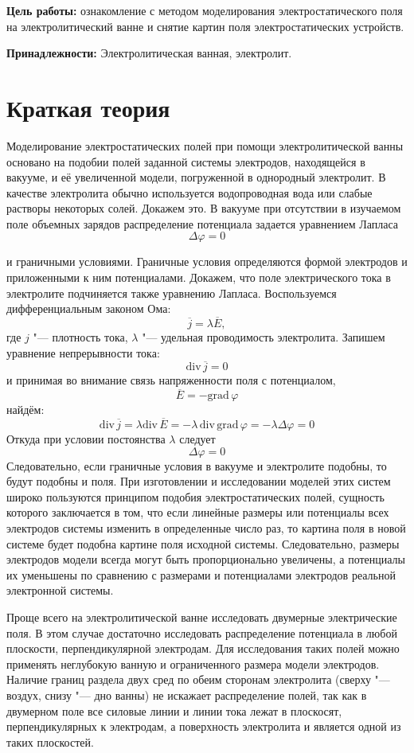 \textbf{Цель работы: } ознакомление с методом моделирования электростатического поля на электролитический ванне и снятие картин поля электростатических устройств.

\textbf{Принадлежности: } Электролитическая ванная, электролит.

\section*{Краткая теория}


Моделирование электростатических полей при помощи электролитической ванны основано на подобии полей заданной системы электродов, находящейся в вакууме, и её увеличенной модели, погруженной в однородный электролит. В качестве электролита обычно используется водопроводная вода или слабые растворы некоторых солей. Докажем это. В вакууме при отсутствии в изучаемом поле объемных зарядов распределение потенциала задается уравнением Лапласа
$$
  \Delta \varphi = 0
$$

 и граничными условиями. Граничные условия определяются формой электродов и приложенными к ним потенциалами. Докажем, что поле электрического тока в электролите подчиняется также уравнению Лапласа.
 Воспользуемся дифференциальным законом Ома:
 $$
  \overline{j} = \lambda \overline{E},
 $$
где $j$ "--- плотность тока, $\lambda$ "--- удельная проводимость электролита. Запишем уравнение непрерывности тока:
$$
  \textrm{div} \,\overline{j} = 0
$$
и принимая во внимание связь напряженности поля с потенциалом,
$$
  \overline{E} = -\textrm{grad} \,\varphi
$$
найдём:
$$
\mathrm{div}\,\overline{j} = \lambda \mathrm{div}\,\overline{E} = -\lambda\, \mathrm{div} \, \mathrm{grad} \, \varphi = -\lambda \Delta \varphi = 0
$$
Откуда при условии постоянства $\lambda$ следует
$$
\Delta\varphi = 0
$$
Следовательно, если граничные условия в вакууме и электролите подобны, то будут подобны и поля.
При изготовлении и исследовании моделей этих систем широко пользуются принципом подобия электростатических полей, сущность которого заключается в том, что если линейные размеры или потенциалы всех электродов системы изменить в определенные число раз, то картина поля в новой системе будет подобна картине поля исходной системы. Следовательно, размеры электродов модели всегда могут быть пропорционально увеличены, а потенциалы их уменьшены по сравнению с размерами и потенциалами электродов реальной электронной системы.

Проще всего на электролитической ванне исследовать двумерные электрические поля. В этом случае достаточно исследовать распределение потенциала в любой плоскости, перпендикулярной электродам. Для исследования таких полей можно применять неглубокую ванную и ограниченного размера модели электродов. Наличие границ раздела двух сред по обеим сторонам электролита (сверху "--- воздух, снизу "--- дно ванны) не искажает распределение полей, так как в двумерном поле все силовые линии и линии тока лежат в плоскосят, перпендикулярных к электродам, а поверхность электролита и является одной из таких плоскостей.

